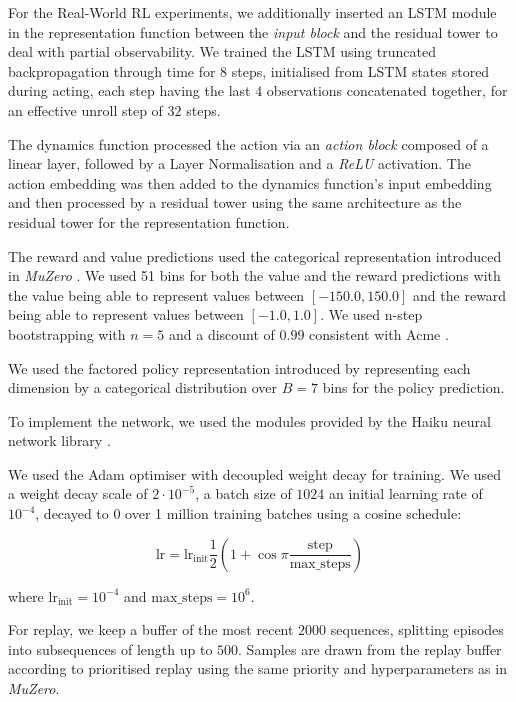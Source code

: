 \documentclass{article}
\newcommand{\muzero}{\emph{MuZero}}
\newcommand{\rwrl}{Real-World RL }
\begin{document}
For the \rwrl experiments, we additionally inserted an LSTM module \cite{lstm} in the representation function between the \emph{input block} and the residual tower to deal with partial observability. We trained the LSTM using truncated backpropagation through time for 8 steps, initialised from LSTM states stored during acting, each step having the last $4$ observations concatenated together, for an effective unroll step of $32$ steps.

The dynamics function processed the action via an \emph{action block} composed of a linear layer, followed by a Layer Normalisation and a \emph{ReLU} activation. The action embedding was then added to the dynamics function's input embedding and then processed by a residual tower using the same architecture as the residual tower for the representation function.

The reward and value predictions used the categorical representation introduced in \muzero{} \cite{muzero}. We used 51 bins for both the value and the reward predictions with the value being able to represent values between $\left[-150.0, 150.0\right]$ and the reward being able to represent values between $\left[-1.0, 1.0\right]$. We used n-step bootstrapping with $n=5$ and a discount of $0.99$ consistent with Acme \cite{hoffman2020acme}.

We used the factored policy representation introduced by \cite{tang2020discretizing} representing each dimension by a categorical distribution over $B=7$ bins for the policy prediction.

To implement the network, we used the modules provided by the Haiku neural network library \cite{haiku2020github}.

We used the Adam optimiser \cite{adam} with decoupled weight decay \cite{adam_weight_decay} for training. We used a weight decay scale of $2 \cdot{} 10^{-5}$, a batch size of $1024$ an initial learning rate of $10^{-4}$, decayed to 0 over 1 million training batches using a cosine schedule:

$$\text{lr} = \text{lr}_\text{init} \frac{1}{2} \left(1+ \cos{\pi \frac{\text{step}}{\text{max\_steps}} }\right)$$

where $\text{lr}_\text{init} = 10^{-4}$ and $\text{max\_steps} = 10^6$.

For replay, we keep a buffer of the most recent $2000$ sequences, splitting episodes into subsequences of length up to $500$. Samples are drawn from the replay buffer according to prioritised replay \cite{Schaul2016} using the same priority and hyperparameters as in \muzero{}.
\end{document}
